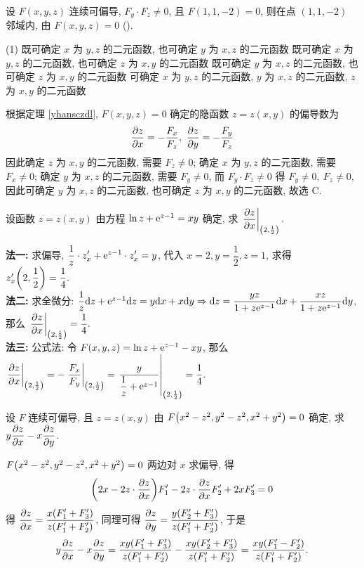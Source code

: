 \begin{example}
    设 $F(x,y,z)$ 连续可偏导, $F_y\cdot F_z\neq 0$, 且 $F(1,1,-2)=0$, 则在点 $(1,1,-2)$ 邻域内, 由 $F(x,y,z)=0$ (\quad).
    \begin{tasks}(1)
        \task 既可确定 $x$ 为 $y,z$ 的二元函数, 也可确定 $y$ 为 $x,z$ 的二元函数
        \task 既可确定 $x$ 为 $y,z$ 的二元函数, 也可确定 $z$ 为 $x,y$ 的二元函数
        \task 既可确定 $y$ 为 $x,z$ 的二元函数, 也可确定 $z$ 为 $x,y$ 的二元函数
        \task 可确定 $x$ 为 $y,z$ 的二元函数, $y$ 为 $x,z$ 的二元函数,  $z$ 为 $x,y$ 的二元函数
    \end{tasks}
\end{example}
\begin{solution}
    根据定理 \ref{yhansczdl}, $F(x,y,z)=0$ 确定的隐函数 $z=z(x,y)$ 的偏导数为
    $$\pdv{z}{x}=-\dfrac{F_x}{F_z},~\pdv{z}{y}=-\dfrac{F_y}{F_z}$$
    因此确定 $z$ 为 $x,y$ 的二元函数, 需要 $F_z\neq0$; 确定 $x$ 为 $y,z$ 的二元函数, 需要 $F_x\neq0$; 确定 $y$ 为 $x,z$ 的二元函数, 需要 $F_y\neq0$,
    而 $F_y\cdot F_z\neq 0$ 得 $F_y\neq0,~F_z\neq0$, 因此可确定 $y$ 为 $x,z$ 的二元函数, 也可确定 $z$ 为 $x,y$ 的二元函数, 故选 C.
\end{solution}

\begin{example}[2018 数三]
    设函数 $z=z(x,y)$ 由方程 $\ln z+\mathrm{e} ^{z-1}=xy$ 确定, 求 $\displaystyle\eval{\pdv{z}{x}}_{\qty(2,\frac{1}{2})}.$
\end{example}
\begin{solution}
    \textbf{法一: }求偏导, $\displaystyle\dfrac{1}{z}\cdot z'_x+\mathrm{e}^{z-1}\cdot z'_x=y$, 代入 $x=2,y=\dfrac{1}{2},z=1$, 求得 $z'_x\qty(2,\dfrac{1}{2})=\dfrac{1}{4}.$\\
    \textbf{法二: }求全微分: $\dfrac{1}{z}\dd z+\mathrm{e} ^{z-1}\dd z=y\dd x+x\dd y\Rightarrow \dd z=\dfrac{yz}{1+z\mathrm{e} ^{z-1}}\dd x+\dfrac{xz}{1+z\mathrm{e} ^{z-1}}\dd y$, 那么 $\displaystyle\eval{\pdv{z}{x}}_{\qty(2,\frac{1}{2})}=\dfrac{1}{4}.$\\
    \textbf{法三: }公式法: 令 $F(x,y,z)=\ln z+\mathrm{e} ^{z-1}-xy$, 那么 $\displaystyle\eval{\pdv{z}{x}}_{\qty(2,\frac{1}{2})}=-\eval{\dfrac{F_x}{F_y}}_{\qty(2,\frac{1}{2})}=\eval{\dfrac{y}{\dfrac{1}{z}+\e ^{z-1}}}_{\qty(2,\frac{1}{2})}=\dfrac{1}{4}.$
\end{solution}

\begin{example}
    设 $F$ 连续可偏导, 且 $z=z(x,y)$ 由 $F\qty(x^2-z^2, y^2-z^2, x^2+y^2)=0$ 确定, 求 $\displaystyle y\pdv{z}{x}-x\pdv{z}{y}$.
\end{example}
\begin{solution}
    $F\qty(x^2-z^2, y^2-z^2, x^2+y^2)=0$ 两边对 $x$ 求偏导, 得
    $$
        \qty(2x-2z\cdot\pdv{z}{x})F'_1-2z\cdot\pdv{z}{x}F'_2+2xF'_3=0
    $$
    得 $\displaystyle \pdv{z}{x}=\dfrac{x\qty(F'_1+F'_3)}{z\qty(F'_1+F'_2)}$, 同理可得 $\displaystyle \pdv{z}{y}=\dfrac{y\qty(F'_2+F'_3)}{z\qty(F'_1+F'_2)}$, 于是
    $$
        y\pdv{z}{x}-x\pdv{z}{y}=\dfrac{xy\qty(F'_1+F'_3)}{z\qty(F'_1+F'_2)}-\dfrac{xy\qty(F'_2+F'_3)}{z\qty(F'_1+F'_2)}=\dfrac{xy\qty(F'_1-F'_2)}{z\qty(F'_1+F'_2)}.
    $$
\end{solution}

